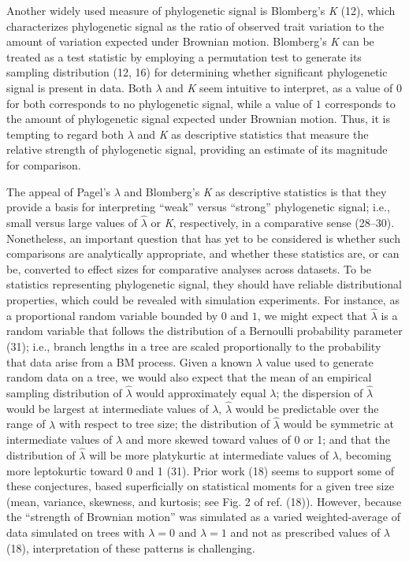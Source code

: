 \documentclass[9pt,twocolumn,twoside,lineno]{pnas-new}
\begin{document}
Another widely used measure of phylogenetic signal is Blomberg's
\emph{K} (12), which characterizes phylogenetic signal as the ratio of
observed trait variation to the amount of variation expected under
Brownian motion. Blomberg's \emph{K} can be treated as a test statistic
by employing a permutation test to generate its sampling distribution
(12, 16) for determining whether significant phylogenetic signal is
present in data. Both \(\lambda\) and \emph{K} seem intuitive to
interpret, as a value of \(0\) for both corresponds to no phylogenetic
signal, while a value of \(1\) corresponds to the amount of phylogenetic
signal expected under Brownian motion. Thus, it is tempting to regard
both \(\lambda\) and \emph{K} as descriptive statistics that measure the
relative strength of phylogenetic signal, providing an estimate of its
magnitude for comparison.

The appeal of Pagel's \(\lambda\) and Blomberg's \emph{K} as descriptive
statistics is that they provide a basis for interpreting ``weak'' versus
``strong'' phylogenetic signal; i.e., small versus large values of
\(\hat{\lambda}\) or \emph{K}, respectively, in a comparative sense
(28--30). Nonetheless, an important question that has yet to be
considered is whether such comparisons are analytically appropriate, and
whether these statistics are, or can be, converted to effect sizes for
comparative analyses across datasets. To be statistics representing
phylogenetic signal, they should have reliable distributional
properties, which could be revealed with simulation experiments. For
instance, as a proportional random variable bounded by \(0\) and \(1\),
we might expect that \(\hat{\lambda}\) is a random variable that follows
the distribution of a Bernoulli probability parameter (31); i.e., branch
lengths in a tree are scaled proportionally to the probability that data
arise from a BM process. Given a known \(\lambda\) value used to
generate random data on a tree, we would also expect that the mean of an
empirical sampling distribution of \(\hat{\lambda}\) would approximately
equal \(\lambda\); the dispersion of \(\hat{\lambda}\) would be largest
at intermediate values of \(\lambda\), \(\hat{\lambda}\) would be
predictable over the range of \(\lambda\) with respect to tree size; the
distribution of \(\hat{\lambda}\) would be symmetric at intermediate
values of \(\lambda\) and more skewed toward values of 0 or 1; and that
the distribution of \(\hat{\lambda}\) will be more platykurtic at
intermediate values of \(\lambda\), becoming more leptokurtic toward 0
and 1 (31). Prior work (18) seems to support some of these conjectures,
based superficially on statistical moments for a given tree size (mean,
variance, skewness, and kurtosis; see Fig. 2 of ref. (18)). However,
because the ``strength of Brownian motion'' was simulated as a varied
weighted-average of data simulated on trees with \(\lambda=0\) and
\(\lambda=1\) and not as prescribed values of \(\lambda\) (18),
interpretation of these patterns is challenging.
\end{document}

